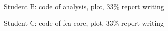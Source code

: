 \documentclass{article}
\begin{document}
Student B: code of analysis, plot, 33$\%$ report writing

Student C: code of fea-core, plot, 33$\%$ report writing













\end{document}
